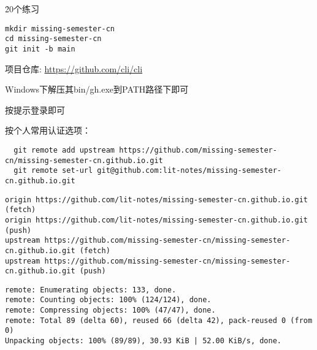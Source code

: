 


\h{20个练习}



\begin{lstlisting}
mkdir missing-semester-cn
cd missing-semester-cn
git init -b main
\end{lstlisting}







项目仓库: \url{https://github.com/cli/cli}


Windows下解压其bin/gh.exe到PATH路径下即可



按提示登录即可

按个人常用认证选项：









\begin{lstlisting}
  git remote add upstream https://github.com/missing-semester-cn/missing-semester-cn.github.io.git
  git remote set-url git@github.com:lit-notes/missing-semester-cn.github.io.git
\end{lstlisting}





\begin{verbatim}
origin https://github.com/lit-notes/missing-semester-cn.github.io.git (fetch)
origin https://github.com/lit-notes/missing-semester-cn.github.io.git (push)
upstream https://github.com/missing-semester-cn/missing-semester-cn.github.io.git (fetch)
upstream https://github.com/missing-semester-cn/missing-semester-cn.github.io.git (push)
\end{verbatim}




\begin{verbatim}
remote: Enumerating objects: 133, done.
remote: Counting objects: 100% (124/124), done.
remote: Compressing objects: 100% (47/47), done.
remote: Total 89 (delta 60), reused 66 (delta 42), pack-reused 0 (from 0)
Unpacking objects: 100% (89/89), 30.93 KiB | 52.00 KiB/s, done.
\end{verbatim}


